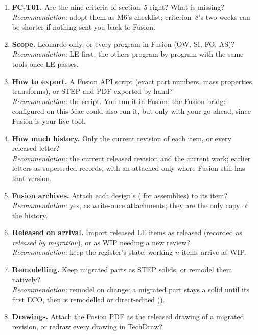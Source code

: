 \begin{enumerate}
  \item \textbf{FC-T01.} Are the nine criteria of section~5 right? What is missing?\\
        \emph{Recommendation:} adopt them as M6's checklist; criterion~8's two weeks can be shorter if nothing
        sent you back to Fusion.
  \item \textbf{Scope.} Leonardo only, or every program in Fusion (OW, SI, FO, AS)?\\
        \emph{Recommendation:} LE first; the others program by program with the same tools once LE passes.
  \item \textbf{How to export.} A Fusion API script (exact part numbers, mass properties, transforms), or STEP and PDF
        exported by hand?\\
        \emph{Recommendation:} the script. You run it in Fusion; the Fusion bridge configured on this Mac could also run
        it, but only with your go-ahead, since Fusion is your live tool.
  \item \textbf{How much history.} Only the current revision of each item, or every released letter?\\
        \emph{Recommendation:} the current released revision and the current work; earlier letters as superseded records,
        with an  attached only where Fusion still has that version.
  \item \textbf{Fusion archives.} Attach each design's  ( for assemblies) to its item?\\
        \emph{Recommendation:} yes, as write-once attachments; they are the only copy of the history.
  \item \textbf{Released on arrival.} Import released LE items as released (recorded as \emph{released by migration}),
        or as WIP needing a new review?\\
        \emph{Recommendation:} keep the register's state; working $n$ items arrive as WIP.
  \item \textbf{Remodelling.} Keep migrated parts as STEP solids, or remodel them natively?\\
        \emph{Recommendation:} remodel on change: a migrated part stays a solid until its first ECO, then is remodelled
        or direct-edited ().
  \item \textbf{Drawings.} Attach the Fusion PDF as the released drawing of a migrated revision, or redraw every
        drawing in TechDraw?\\

\end{enumerate}
